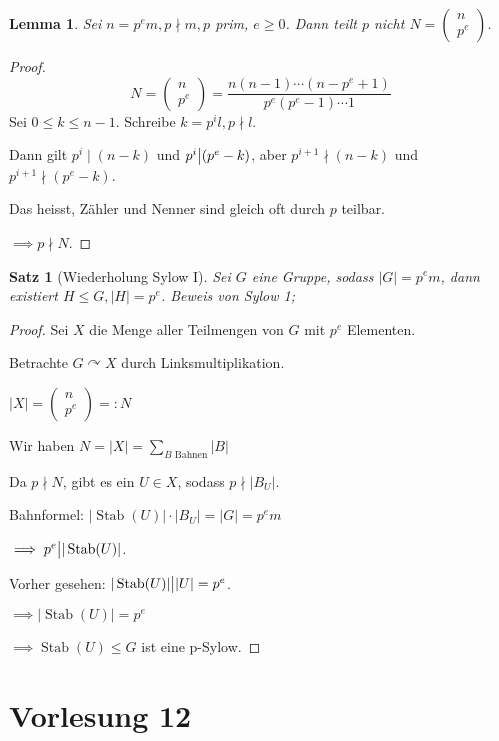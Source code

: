 \documentclass{article}
\theoremstyle{plain}
\newtheorem{lemma}{Lemma}
\newtheorem{theorem}{Satz}
\newcommand{\ug}{\leq}
\newcommand{\teilt}{\big{|}}
\newcommand{\stab}{\mathop\text{Stab}}
\newcommand{\operateson}{\curvearrowright}
\begin{document}
\begin{lemma}
    Sei $n=p^em, p\nmid m, p$ prim, $e\geq 0$. Dann teilt $p$ nicht $N=\begin{pmatrix}
        n\\p^e
    \end{pmatrix}$.
\end{lemma}
\begin{proof}
    $$N=\begin{pmatrix}
        n\\p^e
    \end{pmatrix}=\frac{n(n-1)\cdots(n-p^e+1)}{p^e(p^e-1)\cdots 1}$$
    Sei $0\leq k\leq n-1$. Schreibe $k=p^il, p\nmid l$. 
    
    Dann gilt $p^i\mid (n-k)$ und $p^i\teilt(p^e-k)$, aber $p^{i+1}\nmid (n-k)$ und $p^{i+1}\nmid (p^e-k)$.

    Das heisst, Zähler und Nenner sind gleich oft durch $p$ teilbar.
    
    $\implies p\nmid N$.
\end{proof}

\begin{theorem}[Wiederholung Sylow I]
    Sei $G$ eine Gruppe, sodass $|G|=p^em$, dann existiert $H\ug G, |H|=p^e$. Beweis von Sylow 1;
\end{theorem}
\begin{proof}
    Sei $X$ die Menge aller Teilmengen von $G$ mit $p^e$ Elementen.

    Betrachte $G\operateson X$ durch Linksmultiplikation.

    $|X|=\begin{pmatrix}
        n\\p^e
    \end{pmatrix} =: N$

    Wir haben $N=|X|=\sum\limits_{B \text{ Bahnen}}|B|$

    Da $p\nmid N$, gibt es ein $U\in X$, sodass $p\nmid |B_U|$.

    Bahnformel: $|\stab(U)|\cdot|B_U|=|G|=p^em$

    $\implies p^e\teilt |\stab(U)|$.

    Vorher gesehen: $|\stab(U)|\teilt |U|=p^e$.

    $\implies |\stab(U)|=p^e$

    $\implies \stab(U)\leq G$ ist eine p-Sylow.
\end{proof}

\section*{Vorlesung 12}
\end{document}
